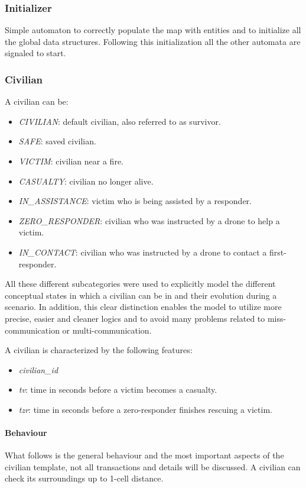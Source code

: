 \subsubsection{Initializer}
Simple automaton to correctly populate the map with entities and to initialize all the global data structures. Following this initialization all the other automata are signaled to start.


\subsubsection{Civilian}
A civilian can be:
\begin{itemize}
	\item \textit{CIVILIAN}: default civilian, also referred to as survivor.
	\item \textit{SAFE}: saved civilian.
	\item \textit{VICTIM}: civilian near a fire.
	\item \textit{CASUALTY}: civilian no longer alive.
	\item \textit{IN\_ASSISTANCE}: victim who is being assisted by a responder.
	\item \textit{ZERO\_RESPONDER}: civilian who was instructed by a drone to help a victim.
	\item \textit{IN\_CONTACT}: civilian who was instructed by a drone to contact a first-responder.
\end{itemize}

\noindent
All these different subcategories were used to explicitly model the different conceptual states in which a civilian can be in and their evolution during a scenario. In addition, this clear distinction enables the model to utilize more precise, easier and cleaner logics and to avoid many problems related to miss-communication or multi-communication.\newline

\noindent
A civilian is characterized by the following features:
\begin{itemize}
	\item \textit{civilian\_id}
	\item \textit{tv}: time in seconds before a victim becomes a casualty.
	\item \textit{tzr}: time in seconds before a zero-responder finishes rescuing a victim.
\end{itemize}

\paragraph{Behaviour}
What follows is the general behaviour and the most important aspects of the civilian template, not all transactions and details will be discussed.\newline
A civilian can check its surroundings up to 1-cell distance.

